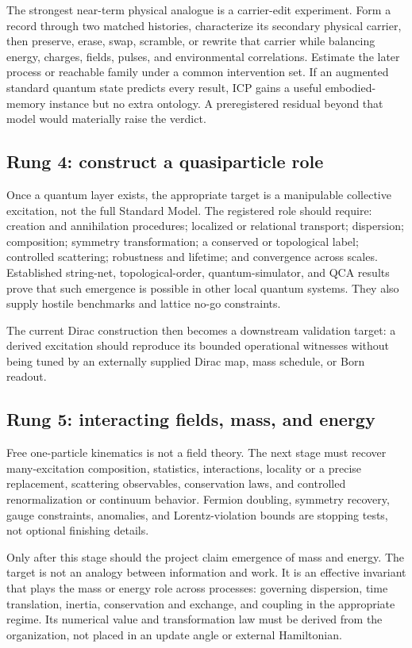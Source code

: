The strongest near-term physical analogue is a carrier-edit experiment. Form a
record through two matched histories, characterize its secondary physical
carrier, then preserve, erase, swap, scramble, or rewrite that carrier while
balancing energy, charges, fields, pulses, and environmental correlations.
Estimate the later process or reachable family under a common intervention set.
If an augmented standard quantum state predicts every result, ICP gains a
useful embodied-memory instance but no extra ontology. A preregistered residual
beyond that model would materially raise the verdict.

\subsection{Rung 4: construct a quasiparticle role}

Once a quantum layer exists, the appropriate target is a manipulable collective
excitation, not the full Standard Model. The registered role should require:
creation and annihilation procedures; localized or relational transport;
dispersion; composition; symmetry transformation; a conserved or topological
label; controlled scattering; robustness and lifetime; and convergence across
scales. Established string-net, topological-order, quantum-simulator, and QCA
results prove that such emergence is possible in other local quantum systems.
They also supply hostile benchmarks and lattice no-go constraints.

The current Dirac construction then becomes a downstream validation target: a
derived excitation should reproduce its bounded operational witnesses without
being tuned by an externally supplied Dirac map, mass schedule, or Born
readout.

\subsection{Rung 5: interacting fields, mass, and energy}

Free one-particle kinematics is not a field theory. The next stage must recover
many-excitation composition, statistics, interactions, locality or a precise
replacement, scattering observables, conservation laws, and controlled
renormalization or continuum behavior. Fermion doubling, symmetry recovery,
gauge constraints, anomalies, and Lorentz-violation bounds are stopping tests,
not optional finishing details.

Only after this stage should the project claim emergence of mass and energy.
The target is not an analogy between information and work. It is an effective
invariant that plays the mass or energy role across processes: governing
dispersion, time translation, inertia, conservation and exchange, and coupling
in the appropriate regime. Its numerical value and transformation law must be
derived from the organization, not placed in an update angle or external
Hamiltonian.

